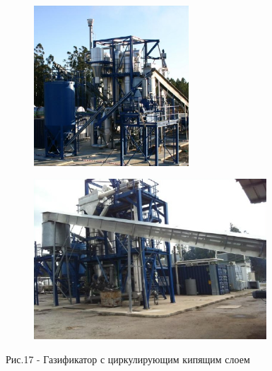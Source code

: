\begin{figure}[H]
    \centering
    \begin{subfigure}[t]{0.45\textwidth}
        \centering
        \includegraphics[width=\textwidth, height=6cm]{media/chem2/image80}
        \caption*{}
    \end{subfigure}
    \begin{subfigure}[t]{0.45\textwidth}
        \centering
        \includegraphics[width=\textwidth, height=6cm]{media/chem2/image81}
        \caption*{}
    \end{subfigure}
    \caption*{Рис.17 - Газификатор с циркулирующим кипящим слоем}
\end{figure}

